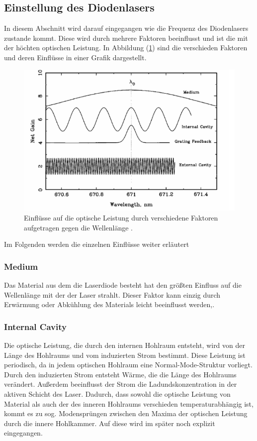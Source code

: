 \subsection{Einstellung des Diodenlasers}
In diesem Abschnitt wird darauf eingegangen wie die Frequenz des Diodenlasers zustande kommt. Diese wird durch mehrere Faktoren beeinflusst und ist die mit der höchten optischen Leistung. In Abbildung (\ref{fig:netga}) sind die verschieden Faktoren und deren Einflüsse in einer Grafik dargestellt.
\begin{figure}[h!]
  \centering
  \includegraphics[scale=0.7]{fig/netga.png}
  \caption{Einflüsse auf die optische Leistung durch verschiedene Faktoren aufgetragen gegen die Wellenlänge \cite[6]{Anleitung}.}
  \label{fig:netga}
\end{figure}
\FloatBarrier
\noindent Im Folgenden werden die einzelnen Einflüsse weiter erläutert
\subsubsection{Medium}
Das Material aus dem die Laserdiode besteht hat den größten Einfluss auf die Wellenlänge mit der der Laser strahlt. Dieser Faktor kann einzig durch Erwärmung oder Abkühlung des Materials leicht
beeinflusst werden,.
\subsubsection{Internal Cavity}
Die optische Leistung, die durch den internen Hohlraum entsteht, wird von der Länge des Hohlraums und vom induzierten Strom bestimmt. Diese Leistung ist periodisch, da in jedem optischen
Hohlraum eine Normal-Mode-Struktur vorliegt. Durch den induzierten Strom entsteht Wärme, die die Länge des Hohlraums verändert. Außerdem beeinflusst der Strom die Ladundskonzentration in
der aktiven Schicht des Laser. Dadurch, dass sowohl die optische Leistung von Material als auch der des inneren Hohlraums verschieden temperaturabhängig ist, kommt es zu sog. Modensprüngen zwischen
den Maxima der optischen Leistung durch die innere Hohlkammer. Auf diese wird im später noch explizit eingegangen.
